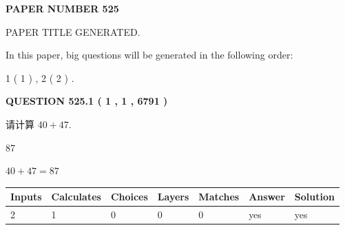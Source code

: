 \documentclass{ctexart}
\begin{document}
   
 {\textbf{ \Large{ PAPER NUMBER  525  }}}
   
   
\vspace{0.2in}
   
   
   
   
   
   
   
   
 \vspace{0.2in}
 
 
 
 
   
   
 PAPER TITLE GENERATED.
   
   
   
\vspace{0.2in}
   
In this paper, big questions will be generated in the following order: 
   
   
   1 ( 1 )
 ,
   2 ( 2 )
 .
  
\vspace{0.2in}
  
{\textbf{\Large{QUESTION
525.1 
 ( 1 , 1 , 6791 )
}}}
  
  
 
请计算 $ %
40 +  %
47 $.
 
 
 
\noindent{}
 
 

87
 
 
\noindent{}
 
 

 
 
 
\noindent{}
 
 

$ %
40 +  %
47=   %
87$
 
 
\noindent{}
 
 

 
   
   
   
   
\noindent\begin{tabular}{|l|l|l|l|l|l|l|}
 \hline
Inputs & Calculates & Choices & Layers & Matches & Answer & Solution \\ \hline
 2  & 
 1  & 
 0
  & 
 0  & 
 0  & 
  yes & 
  yes 
  \\ \hline
 \end{tabular}
   
\end{document}
